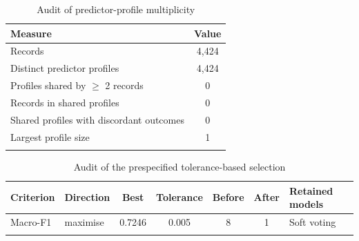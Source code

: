 \begin{table}[!htbp]
\caption{Audit of predictor-profile multiplicity}\label{tab:TableS2_profile_audit}
\small
\begin{tabular*}{\textwidth}{@{\extracolsep\fill}@{}lc@{}}
\toprule
Measure & Value \\
\midrule
Records & 4,424 \\
Distinct predictor profiles & 4,424 \\
Profiles shared by $\geq$ 2 records & 0 \\
Records in shared profiles & 0 \\
Shared profiles with discordant outcomes & 0 \\
Largest profile size & 1 \\
\botrule
\end{tabular*}
\end{table}

\begin{table}[!htbp]
\caption{Audit of the prespecified tolerance-based selection}\label{tab:TableS3_selection_audit}
\footnotesize
\begin{tabular*}{\textwidth}{@{\extracolsep\fill}@{}llccccl@{}}
\toprule
Criterion & Direction & Best & Tolerance & Before & After & Retained models \\
\midrule
Macro-F1 & maximise & 0.7246 & 0.005 & 8 & 1 & Soft voting \\
\botrule
\end{tabular*}
\end{table}

